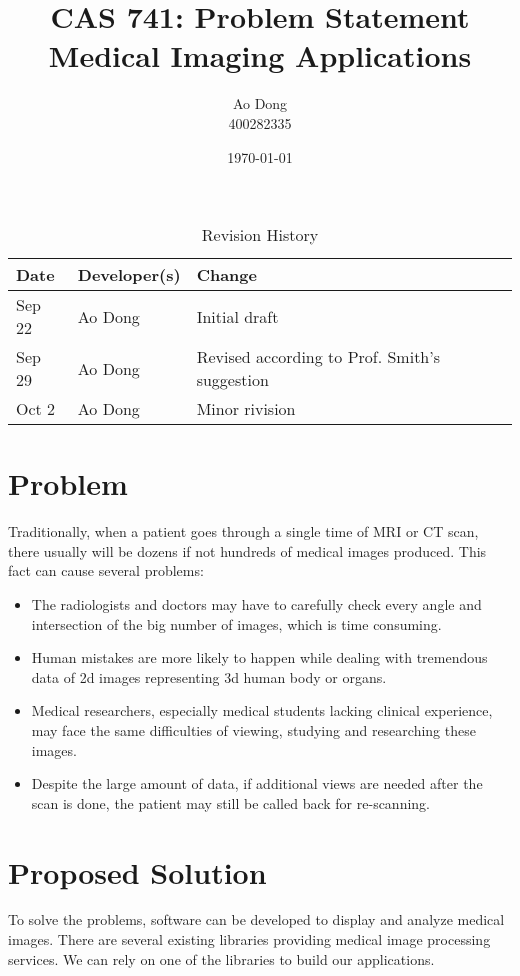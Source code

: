 \documentclass{article}
\title{CAS 741: Problem Statement\\Medical Imaging Applications}
\author{Ao Dong\\400282335}
\date{\today}
\begin{document}
\maketitle

\begin{table}[hp]
\caption{Revision History} \label{TblRevisionHistory}
\begin{tabularx}{\textwidth}{llX}
\toprule
\textbf{Date} & \textbf{Developer(s)} & \textbf{Change}\\
\midrule
Sep 22 & Ao Dong & Initial draft\\
Sep 29 & Ao Dong & Revised according to Prof. Smith's suggestion\\
Oct 2 & Ao Dong & Minor rivision\\
\bottomrule
\end{tabularx}
\end{table}

\section*{Problem}
Traditionally, when a patient goes through a single time of MRI or CT scan, there usually will be dozens if not hundreds of medical images produced. This fact can cause several problems:

\begin{itemize}
\item The radiologists and doctors may have to carefully check every angle and intersection of the big number of images, which is time consuming.
\item Human mistakes are more likely to happen while dealing with tremendous data of 2d images representing 3d human body or organs.
\item Medical researchers, especially medical students lacking clinical experience, may face the same difficulties of viewing, studying and researching these images.
\item Despite the large amount of data, if additional views are needed after the scan is done, the patient may still be called back for re-scanning.
\end{itemize}

\section*{Proposed Solution}
To solve the problems, software can be developed to display and analyze medical images. There are several existing libraries providing medical image processing services. We can rely on one of the libraries to build our applications.
\end{document}
